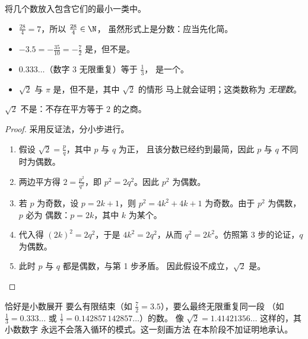 \begin{example}\label{ex:g10:numbers:classify}
将几个数放入包含它们的最小一类中。
\begin{itemize}
  \item $\frac{28}{4} = 7$，所以 $\frac{28}{4} \in \N$，
        虽然形式上是分数：应当先化简。
  \item $-3.5 = -\frac{35}{10} = -\frac72$ 是，但不是。
  \item $0.333\dots$（数字 $3$ 无限重复）等于 $\frac13$，
        是一个。
  \item $\sqrt 2$ 与 $\pi$ 是，但不是，其中 $\sqrt 2$ 的情形
        马上就会证明；这类数称为
        \emph{无理数}。
\end{itemize}
\end{example}

\begin{theorem}\label{thm:g10:numbers:sqrt2}
$\sqrt 2$ 不是：不存在平方等于
$2$ 的之商。
\end{theorem}

\begin{proof}
采用反证法，分小步进行。
\begin{enumerate}
  \item 假设 $\sqrt 2 = \frac{p}{q}$，其中 $p$ 与 $q$ 为正，
        且该分数已经约到最简，因此 $p$ 与 $q$
        不同时为偶数。
  \item 两边平方得 $2 = \frac{p^2}{q^2}$，即
        $p^2 = 2q^2$。因此 $p^2$ 为偶数。
  \item 若 $p$ 为奇数，设 $p = 2k+1$，则
        $p^2 = 4k^2 + 4k + 1$ 为奇数。由于 $p^2$ 为偶数，$p$ 必为
        偶数：$p = 2k$，其中 $k$ 为某个。
  \item 代入得 $(2k)^2 = 2q^2$，于是 $4k^2 = 2q^2$，从而
        $q^2 = 2k^2$。仿照第 3 步的论证，$q$ 为偶数。
  \item 此时 $p$ 与 $q$ 都是偶数，与第 1 步矛盾。
        因此假设不成立，$\sqrt 2$ 是。
\end{enumerate}
\end{proof}

\begin{remark}
恰好是小数展开
要么有限结束（如 $\frac72 = 3.5$），要么最终无限重复同一段
（如 $\frac13 = 0.333\dots$ 或 $\frac{1}{7} = 0.142857\,142857\dots$）的数。
像 $\sqrt2 = 1.41421356\dots$ 这样的，其小数数字
永远不会落入循环的模式。这一刻画方法
在本阶段不加证明地承认。
\end{remark}

